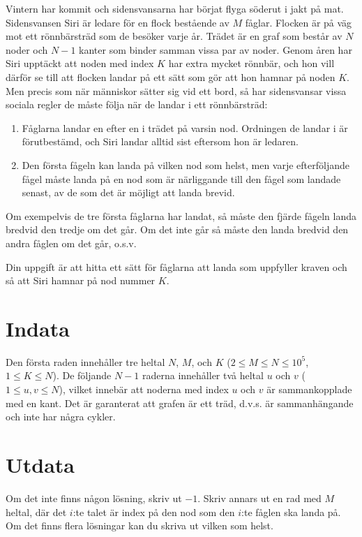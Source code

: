 Vintern har kommit och sidensvansarna har börjat flyga söderut i jakt på mat. Sidensvansen Siri är ledare för en 
flock bestående av $M$ fåglar. Flocken är på väg mot ett rönnbärsträd som de besöker varje år. Trädet är en graf som består av $N$ noder
och $N-1$ kanter som binder samman vissa par av noder. Genom åren har Siri upptäckt att noden med index $K$ har extra 
mycket rönnbär, och hon vill därför se till att flocken landar på ett sätt som gör att hon hamnar på noden $K$. 
Men precis som när människor sätter sig vid ett bord, så har sidensvansar vissa sociala regler de måste följa när 
de landar i ett rönnbärsträd:

\begin{enumerate}
\item Fåglarna landar en efter en i trädet på varsin nod. Ordningen de landar i är förutbestämd, och Siri landar 
alltid sist eftersom hon är ledaren.
\item Den första fågeln kan landa på vilken nod som helst, men varje efterföljande fågel måste landa på en nod som 
är närliggande till den fågel som landade senast, av de som det är möjligt att landa brevid.
\end{enumerate}

Om exempelvis de tre första fåglarna har landat, så måste den fjärde fågeln landa bredvid den tredje om det går. Om det 
inte går så måste den landa bredvid den andra fåglen om det går, o.s.v.

Din uppgift är att hitta ett sätt för fåglarna att landa som uppfyller kraven och så att Siri hamnar på nod nummer $K$.

\section*{Indata}
Den första raden innehåller tre heltal $N$, $M$, och $K$ ($2 \leq M \leq N \leq 10^5$, $1 \leq K \leq N$).
De följande $N-1$ raderna innehåller två heltal $u$ och $v$ ($1 \leq u,v \leq N$), vilket innebär att noderna med 
index $u$ och $v$ är sammankopplade med en kant.
Det är garanterat att grafen är ett träd, d.v.s. är sammanhängande och inte har några cykler.

\section*{Utdata}
Om det inte finns någon lösning, skriv ut $-1$. Skriv annars ut en rad med $M$ heltal, där det $i$:te talet 
är index på den nod som den $i$:te fåglen ska landa på. Om det finns flera lösningar kan du skriva ut vilken som 
helst.

